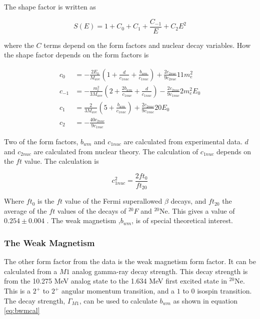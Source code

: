 \documentclass[../MaxHughesThesis.tex]{subfiles}
\begin{document}
The shape factor is written as 

\begin{equation}
	\label{eq:shapefactor}
	S(E) = 1 + C_{0} + C_{1} + \frac{C_{-1}}{E} + C_{2}E^{2}	
\end{equation}

where the $C$ terms depend on the form factors and nuclear decay variables.
How the shape factor depends on the form factors is \cite{Cal77}

\begin{equation}
	\label{eq:sfcs}
	\begin{split}
	c_{0} & = -\frac{2 E_{0}}{M_{ave}}(1 + \frac{d}{c_{1nuc}} + \frac{b_{wm}}{c_{1nuc}})  + \frac{2 c_{2nuc}}{9 c_{2nuc}} 11 m_{e}^{2} \\
	c_{-1} & = -\frac{m_{e}^{2}}{3M_{ave}} (2 + \frac{2b_{wm}}{c_{1nuc}} + \frac{d}{c_{1nuc}})  - \frac{2 c_{2nuc}}{9 c_{1nuc}} 2 m_{e}^{2} E_{0}\\
	c_{1} & =  \frac{2}{3M_{ave}} (5 + \frac{b_{wm}}{c_{1nuc}}) + \frac{2 c_{2nuc}}{9 c_{1nuc}} 20 E_{0} \\
	c_{2} & = -\frac{40 c_{2nuc}}{9 c_{1nuc}} 
	\end{split}
\end{equation}

Two of the form factors, $b_{wm}$ and $c_{1nuc}$ are calculated from experimental data. 
$d$ and $c_{2nuc}$ are calculated from nuclear theory. 
The calculation of $c_{1nuc}$ depends on the $ft$ value. 
The calculation is \cite{Min11}

\begin{equation}
	c_{1nuc}^{2} = \frac{2 ft_{0}}{ft_{20}}
	\label{eq:c1eq}
\end{equation}

Where $ft_{0}$ is the $ft$ value of the Fermi superallowed $\beta$ decays, and $ft_{20}$ the average of the $ft$ values of the decays of $^{20}F$ and $^{20}$Ne.
This gives a value of $0.254 \pm 0.004$ \cite{Min11}.
The weak magnetism ,$b_{wm}$, is of special theoretical interest. 

\subsubsection{The Weak Magnetism}
The other form factor from the data is the weak magnetism form factor. 
It can be calculated from a $M1$ analog gamma-ray decay strength.
This decay strength is from the 10.275 MeV analog state to the 1.634 MeV first excited state in $^{20}$Ne.
This is a $2^{+}$ to $2^{+}$ angular momentum transition, and a $1$ to $0$ isospin transition.
The decay strength, $\Gamma_{M1}$, can be used to calculate $b_{wm}$ as shown in equation \ref{eq:bwmcal}
\end{document}

